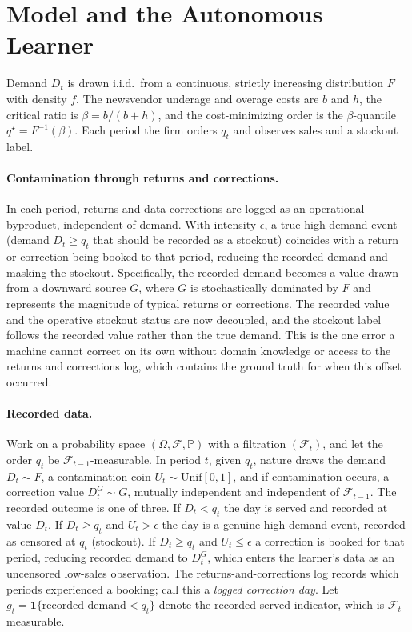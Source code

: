 \documentclass[11pt]{article}
\theoremstyle{plain}
\begin{document}
\section{Model and the Autonomous Learner}\label{sec:model}

Demand $D_t$ is drawn i.i.d.\ from a continuous, strictly increasing distribution
$F$ with density $f$. The newsvendor underage and overage costs are $b$ and $h$,
the critical ratio is $\beta=b/(b+h)$, and the cost-minimizing order is the
$\beta$-quantile $q^\star=F^{-1}(\beta)$. Each period the firm orders $q_t$ and
observes sales and a stockout label.

\paragraph{Contamination through returns and corrections.}
In each period, returns and data corrections are logged as an operational byproduct,
independent of demand. With intensity $\epsilon$, a true high-demand event (demand
$D_t \ge q_t$ that should be recorded as a stockout) coincides with a return or
correction being booked to that period, reducing the recorded demand and masking
the stockout. Specifically, the recorded demand becomes a value drawn from a
downward source $G$, where $G$ is stochastically dominated by $F$ and represents
the magnitude of typical returns or corrections. The recorded value and the
operative stockout status are now decoupled, and the stockout label follows the
recorded value rather than the true demand. This is the one error a machine cannot
correct on its own without domain knowledge or access to the returns and corrections
log, which contains the ground truth for when this offset occurred.

\paragraph{Recorded data.}
Work on a probability space $(\Omega,\mathcal F,\mathbb P)$ with a filtration
$(\mathcal F_t)$, and let the order $q_t$ be $\mathcal F_{t-1}$-measurable. In period
$t$, given $q_t$, nature draws the demand $D_t\sim F$, a contamination coin
$U_t\sim\mathrm{Unif}[0,1]$, and if contamination occurs, a correction value $D_t^G\sim G$,
mutually independent and independent of $\mathcal F_{t-1}$. The recorded outcome is one of
three. If $D_t<q_t$ the day is served and recorded at value $D_t$. If $D_t\ge q_t$
and $U_t>\epsilon$ the day is a genuine high-demand event, recorded as censored at $q_t$
(stockout). If $D_t\ge q_t$ and $U_t\le\epsilon$ a correction is booked for that period,
reducing recorded demand to $D_t^G$, which enters the learner's data as an uncensored
low-sales observation. The returns-and-corrections log records which periods experienced
a booking; call this a \textit{logged correction day}. Let
$g_t=\mathbf 1\{\text{recorded demand}<q_t\}$ denote the recorded served-indicator,
which is $\mathcal F_t$-measurable.
\end{document}
